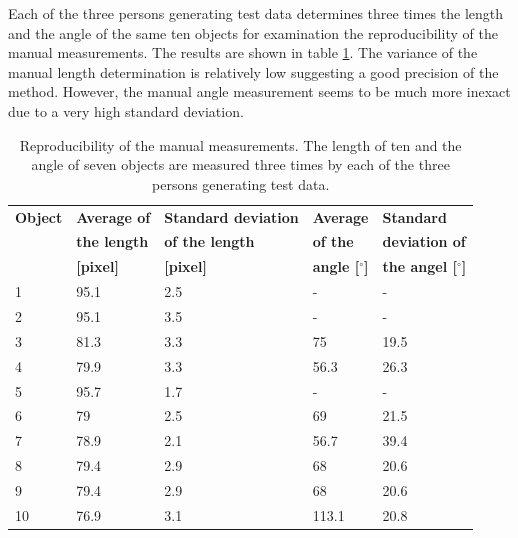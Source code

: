 \documentclass{article}
\begin{document}
Each of the three persons generating test data determines three times the length and the angle of the same ten objects for examination the reproducibility of the manual measurements. The results are shown in table \ref{tab:validation_table2}. The variance of the manual length determination is relatively low suggesting a good precision of the method. However, the manual angle measurement seems to be much more inexact due to a very high standard deviation. 


\begin{table}[!htbp]
	\centering
	\caption{Reproducibility of the manual measurements. The length of ten and the angle of seven objects are measured three times by each of the three persons generating test data.}
	\begin{tabular*}{\textwidth}{lllll} \hline
		\textbf{Object} & \textbf{Average of} & \textbf{Standard deviation} & \textbf{Average} & \textbf{Standard} \\ 
		& \textbf{the length} & \textbf{of the length} & \textbf{of the} & \textbf{deviation of} \\ 
		& \textbf{[pixel]} & \textbf{[pixel]} & \textbf{angle [$^\circ$]} & \textbf{the angel [$^\circ$]} \\ \hline
		1     & 95.1  & 2.5   & -     & - \\
		2     & 95.1  & 3.5   & -     & - \\
		3     & 81.3  & 3.3   & 75    & 19.5 \\
		4     & 79.9  & 3.3   & 56.3  & 26.3 \\
		5     & 95.7  & 1.7   & -     & - \\
		6     & 79    & 2.5   & 69    & 21.5 \\
		7     & 78.9  & 2.1   & 56.7  & 39.4 \\
		8     & 79.4  & 2.9   & 68    & 20.6 \\
		9     & 79.4  & 2.9   & 68    & 20.6 \\
		10    & 76.9  & 3.1   & 113.1 & 20.8 \\ \hline
	\end{tabular*}%
	\label{tab:validation_table2}%
\end{table}%
\end{document}

